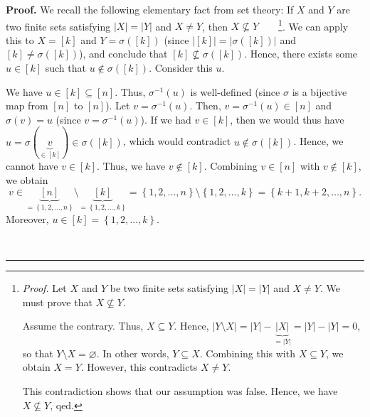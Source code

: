 \documentclass[numbers=enddot,12pt,final,onecolumn,notitlepage,english]{scrartcl}%
\theoremstyle{definition}
\newenvironment{proof}[1][Proof]{\noindent\textbf{#1.} }{\ \rule{0.5em}{0.5em}}
\newenvironment{verlong}{}{}
\begin{document}
\begin{verlong}
\begin{proof}
We recall the following elementary fact from set theory: If $X$ and $Y$ are
two finite sets satisfying $\left\vert X\right\vert =\left\vert Y\right\vert $
and $X\neq Y$, then $X\not \subseteq Y$\ \ \ \ \footnote{\textit{Proof.} Let
$X$ and $Y$ be two finite sets satisfying $\left\vert X\right\vert =\left\vert
Y\right\vert $ and $X\neq Y$. We must prove that $X\not \subseteq Y$.
\par
Assume the contrary. Thus, $X\subseteq Y$. Hence, $\left\vert Y\setminus
X\right\vert =\left\vert Y\right\vert -\underbrace{\left\vert X\right\vert
}_{=\left\vert Y\right\vert }=\left\vert Y\right\vert -\left\vert Y\right\vert
=0$, so that $Y\setminus X=\varnothing$. In other words, $Y\subseteq X$.
Combining this with $X\subseteq Y$, we obtain $X=Y$. However, this contradicts
$X\neq Y$.
\par
This contradiction shows that our assumption was false. Hence, we have
$X\not \subseteq Y$, qed.}. We can apply this to $X=\left[  k\right]  $ and
$Y=\sigma\left(  \left[  k\right]  \right)  $ (since $\left\vert \left[
k\right]  \right\vert =\left\vert \sigma\left(  \left[  k\right]  \right)
\right\vert $ and $\left[  k\right]  \neq\sigma\left(  \left[  k\right]
\right)  $), and conclude that $\left[  k\right]  \not \subseteq \sigma\left(
\left[  k\right]  \right)  $. Hence, there exists some $u\in\left[  k\right]
$ such that $u\notin\sigma\left(  \left[  k\right]  \right)  $. Consider this
$u$.

We have $u\in\left[  k\right]  \subseteq\left[  n\right]  $. Thus,
$\sigma^{-1}\left(  u\right)  $ is well-defined (since $\sigma$ is a bijective
map from $\left[  n\right]  $ to $\left[  n\right]  $). Let $v=\sigma
^{-1}\left(  u\right)  $. Then, $v=\sigma^{-1}\left(  u\right)  \in\left[
n\right]  $ and $\sigma\left(  v\right)  =u$ (since $v=\sigma^{-1}\left(
u\right)  $). If we had $v\in\left[  k\right]  $, then we would thus have
$u=\sigma\left(  \underbrace{v}_{\in\left[  k\right]  }\right)  \in
\sigma\left(  \left[  k\right]  \right)  $, which would contradict
$u\notin\sigma\left(  \left[  k\right]  \right)  $. Hence, we cannot have
$v\in\left[  k\right]  $. Thus, we have $v\notin\left[  k\right]  $. Combining
$v\in\left[  n\right]  $ with $v\notin\left[  k\right]  $, we obtain%
\[
v\in\underbrace{\left[  n\right]  }_{=\left\{  1,2,\ldots,n\right\}
}\setminus\underbrace{\left[  k\right]  }_{=\left\{  1,2,\ldots,k\right\}
}=\left\{  1,2,\ldots,n\right\}  \setminus\left\{  1,2,\ldots,k\right\}
=\left\{  k+1,k+2,\ldots,n\right\}  .
\]
Moreover, $u\in\left[  k\right]  =\left\{  1,2,\ldots,k\right\}  $.


\end{proof}
\end{verlong}
\end{document}
